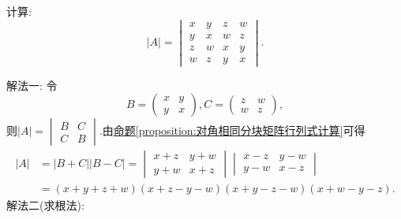 \documentclass[lang=cn,newtx,10pt,scheme=chinese]{elegantbook}
\begin{document}
\begin{example}
计算:
\[
|A| = 
\begin{vmatrix}
x & y & z & w\\
y & x & w & z\\
z & w & x & y\\
w & z & y & x
\end{vmatrix}.
\]
\end{example}
\begin{solution}
    {\color{blue}解法一:}
    令
\[
B = 
\begin{pmatrix}
x & y\\
y & x
\end{pmatrix},
C = 
\begin{pmatrix}
z & w\\
w & z
\end{pmatrix},
\]
则\(|A| = 
\begin{vmatrix}
B & C\\
C & B
\end{vmatrix}\).由\hyperref[proposition:对角相同分块矩阵行列式计算]{命题\ref{proposition:对角相同分块矩阵行列式计算}}可得
\begin{align*}
|A|&=|B + C||B - C|
=\begin{vmatrix}
x + z & y + w\\
y + w & x + z
\end{vmatrix}\begin{vmatrix}
x - z & y - w\\
y - w & x - z
\end{vmatrix}\\
&=(x + y + z + w)(x + z - y - w)(x + y - z - w)(x + w - y - z).
\end{align*}
{\color{blue}解法二(求根法):}
\end{solution}
\end{document}
